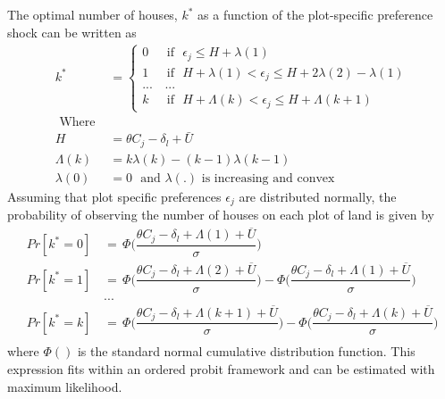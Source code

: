 \documentclass[12pt]{article}
\begin{document}
The optimal number of houses, $k^{*}$ as a function of the plot-specific preference shock can be written as 
\begin{align*}
k^{*} &=
\begin{cases}
0 &\text{ if }\,\, \epsilon_j \leq H + \lambda(1)  \\
1 &\text{ if }\,\,  H + \lambda(1)  < \epsilon_j \leq H  + 2\lambda(2) - \lambda(1)  \\
... & \, ... \\
k &\text{ if }\,\,  H + \Lambda(k) < \epsilon_j \leq H + \Lambda(k+1)
\end{cases} \\
\text{ Where }& \\
H & = \theta C_{j} - \delta_{l}  + \bar{U} \\
\Lambda(k) & =  k\lambda(k) - (k-1)\lambda(k-1) \\
\lambda(0) & = 0 \,\, \text{ and } \lambda(.) \text{ is increasing and convex }
\end{align*}
Assuming that plot specific preferences $\epsilon_j$ are distributed normally, the probability of observing the number of houses on each plot of land is given by
\begin{align*}
Pr[ k^{*} =0 ] \, &= \, \Phi\Bigg(\dfrac{\theta C_{j} - \delta_{l} + \Lambda(1) + \overline{U}}{\sigma}\Bigg) \\
Pr[ k^{*} =1 ] \, &= \, \Phi\Bigg(\dfrac{\theta C_{j} - \delta_{l} + \Lambda(2) + \overline{U}}{\sigma}\Bigg) - \Phi\Bigg(\dfrac{\theta C_{j} - \delta_{l} +  \Lambda(1)  + \overline{U}}{\sigma}\Bigg) \\
&... \\
Pr[ k^{*} =k ] \, &= \, \Phi\Bigg(\dfrac{\theta C_{j} - \delta_{l} + \Lambda(k+1) + \overline{U}}{\sigma}\Bigg) - \Phi\Bigg(\dfrac{\theta C_{j} - \delta_{l} + \Lambda(k) + \overline{U}}{\sigma}\Bigg) \\
\end{align*}
where $\Phi()$ is the standard normal cumulative distribution function.  This expression fits within an ordered probit framework and can be estimated with maximum likelihood.
\end{document}
